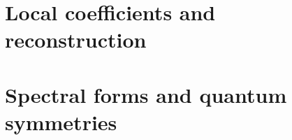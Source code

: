 \documentclass[11pt,twoside,openright]{memoir}
\begin{document}
\part{Local coefficients and reconstruction}




\part{Spectral forms and quantum symmetries}
















\backmatter


\end{document}

